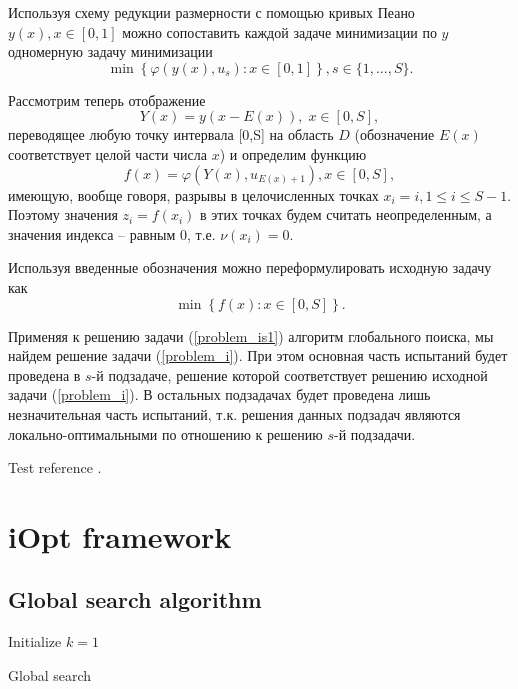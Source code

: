 \documentclass[preprint,12pt]{elsarticle}
\begin{document}
Используя схему редукции размерности с помощью кривых Пеано $y(x), x\in [0,1]$ можно сопоставить каждой задаче минимизации по $y$ одномерную задачу минимизации
\[
 \min{\left\{ \varphi(y(x),u_s): x \in [0,1] \right\}}, s \in \{1,...,S\}.
\]

Рассмотрим теперь отображение 
\[
Y(x)=y(x-E(x)), \; x\in[0,S],
\]
переводящее любую точку интервала [0,S] на область $D$ (обозначение $E(x)$ соответствует целой части числа $x$) и определим функцию 
\[
f(x) = \varphi(Y(x),u_{E(x)+1}), x\in[0,S],
\]
имеющую, вообще говоря, разрывы в целочисленных точках $x_i = i, 1\leq i \leq S-1$.
Поэтому значения  $z_i = f(x_i)$ в этих точках будем считать неопределенным, а значения индекса -- равным 0, т.е. $\nu(x_i) = 0$.

Используя введенные обозначения можно переформулировать исходную задачу как
\begin{equation}\label{problem_is1}
\min \left\{f(x): x \in [0,S] \right\}.
\end{equation}

Применяя к решению задачи (\ref{problem_is1}) алгоритм глобального поиска, мы найдем решение задачи (\ref{problem_i}). При этом основная часть испытаний будет проведена в $s$-й подзадаче, решение которой соответствует решению исходной задачи (\ref{problem_i}). В остальных подзадачах будет проведена лишь незначительная часть испытаний, т.к. решения данных подзадач являются локально-оптимальными по отношению к решению $s$-й подзадачи.


Test reference \cite{Strongin2000,Barkalov2021}.


\section{iOpt framework} 
\label{sec_iOpt}

\subsection{Global search algorithm}
\label{sec_GSA}

\begin{algorithm}
 \LinesNumbered
 Initialize $k=1$\\
 \caption{Global search}
\end{algorithm}
\end{document}

